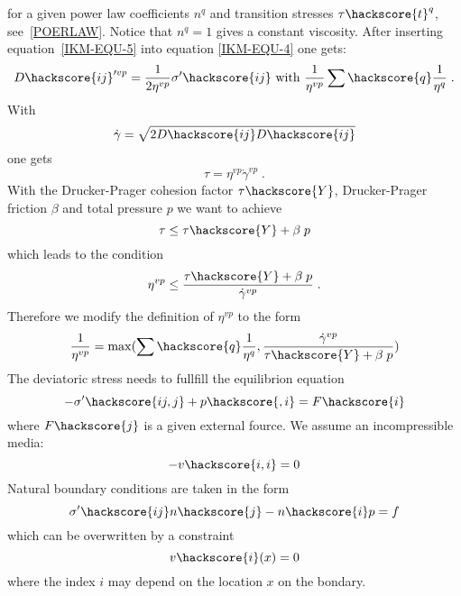 for a given power law coefficients $n^{q}$ and transition stresses $\tau\hackscore{t}^q$, see~\ref{POERLAW}.
Notice that $n^{q}=1$ gives a constant viscosity.
After inserting equation~\ref{IKM-EQU-5} into equation \ref{IKM-EQU-4} one gets:
\begin{equation}\label{IKM-EQU-6}
D\hackscore{ij}'^{vp}=\frac{1}{2 \eta^{vp}} \sigma'\hackscore{ij} \mbox{ with } \frac{1}{\eta^{vp}} \sum\hackscore{q} \frac{1}{\eta^{q}} \;.
\end{equation}
With
\begin{equation}\label{IKM-EQU-8}
\dot{\gamma}=\sqrt{2 D\hackscore{ij} D\hackscore{ij}}
\end{equation}
one gets 
\begin{equation}\label{IKM-EQU-8b}
\tau = \eta^{vp} \dot{\gamma}^{vp} \;.
\end{equation}
With the Drucker-Prager cohesion factor $\tau\hackscore{Y}$, Drucker-Prager friction $\beta$ and total pressure $p$ we want to achieve 
\begin{equation}\label{IKM-EQU-8c}
\tau \le \tau\hackscore{Y} + \beta \; p
\end{equation}
which leads to the condition
\begin{equation}\label{IKM-EQU-8d}
\eta^{vp} \le \frac{\tau\hackscore{Y} + \beta \; p}{ \dot{\gamma}^{vp}} \; .
\end{equation}
Therefore we modify the definition of $\eta^{vp}$ to the form
\begin{equation}\label{IKM-EQU-6b}
\frac{1}{\eta^{vp}}=\max(\sum\hackscore{q} \frac{1}{\eta^{q}}, \frac{\dot{\gamma}^{vp}} {\tau\hackscore{Y} + \beta \; p})
\end{equation}
The deviatoric stress needs to fullfill the equilibrion equation
\begin{equation}\label{IKM-EQU-1}
-\sigma'\hackscore{ij,j}+p\hackscore{,i}=F\hackscore{i}
\end{equation}
where $F\hackscore{j}$ is a given external fource. We assume an incompressible media:
\begin{equation}\label{IKM-EQU-2}
-v\hackscore{i,i}=0
\end{equation}
Natural boundary conditions are taken in the form 
\begin{equation}\label{IKM-EQU-Boundary}
\sigma'\hackscore{ij}n\hackscore{j}-n\hackscore{i}p=f
\end{equation}
which can be overwritten by a constraint 
\begin{equation}\label{IKM-EQU-Boundary0}
v\hackscore{i}(x)=0
\end{equation}
where the index $i$ may depend on the location $x$ on the bondary.

